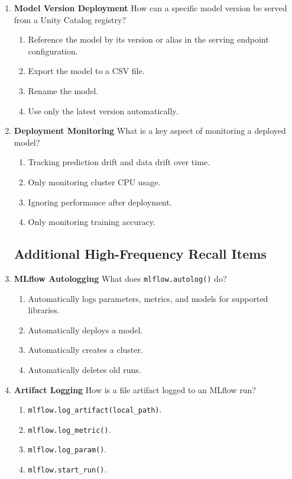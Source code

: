 \documentclass{article}
\begin{document}
\begin{enumerate}[label=\textbf{Q\arabic*.}]
		\item \textbf{Model Version Deployment}
		How can a specific model version be served from a Unity Catalog registry?
		\begin{enumerate}[label=\Alph*.]
			\item Reference the model by its version or alias in the serving endpoint configuration.
			\item Export the model to a CSV file.
			\item Rename the model.
			\item Use only the latest version automatically.
		\end{enumerate}
		
		\item \textbf{Deployment Monitoring}
		What is a key aspect of monitoring a deployed model?
		\begin{enumerate}[label=\Alph*.]
			\item Tracking prediction drift and data drift over time.
			\item Only monitoring cluster CPU usage.
			\item Ignoring performance after deployment.
			\item Only monitoring training accuracy.
		\end{enumerate}
		
		\subsection*{Additional High-Frequency Recall Items}
		
		\item \textbf{MLflow Autologging}
		What does \texttt{mlflow.autolog()} do?
		\begin{enumerate}[label=\Alph*.]
			\item Automatically logs parameters, metrics, and models for supported libraries.
			\item Automatically deploys a model.
			\item Automatically creates a cluster.
			\item Automatically deletes old runs.
		\end{enumerate}
		
		\item \textbf{Artifact Logging}
		How is a file artifact logged to an MLflow run?
		\begin{enumerate}[label=\Alph*.]
			\item \texttt{mlflow.log\_artifact(local\_path)}.
			\item \texttt{mlflow.log\_metric()}.
			\item \texttt{mlflow.log\_param()}.
			\item \texttt{mlflow.start\_run()}.
		\end{enumerate}
		

\end{enumerate}
\end{document}
